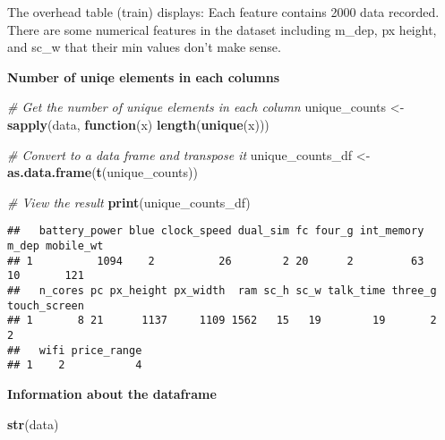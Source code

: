 \documentclass[
]{article}
\newenvironment{Shaded}{\begin{snugshade}}{\end{snugshade}}
\newcommand{\CommentTok}[1]{\textcolor[rgb]{0.56,0.35,0.01}{\textit{#1}}}
\newcommand{\ControlFlowTok}[1]{\textcolor[rgb]{0.13,0.29,0.53}{\textbf{#1}}}
\newcommand{\FunctionTok}[1]{\textcolor[rgb]{0.13,0.29,0.53}{\textbf{#1}}}
\newcommand{\NormalTok}[1]{#1}
\newcommand{\OtherTok}[1]{\textcolor[rgb]{0.56,0.35,0.01}{#1}}
\begin{document}
The overhead table (train) displays: Each feature contains 2000 data
recorded. There are some numerical features in the dataset including
m\_dep, px height, and sc\_w that their min values don't make sense.

\textbf{Number of uniqe elements in each columns}

\begin{Shaded}
\begin{Highlighting}[]
\CommentTok{\# Get the number of unique elements in each column}
\NormalTok{unique\_counts }\OtherTok{\textless{}{-}} \FunctionTok{sapply}\NormalTok{(data, }\ControlFlowTok{function}\NormalTok{(x) }\FunctionTok{length}\NormalTok{(}\FunctionTok{unique}\NormalTok{(x)))}

\CommentTok{\# Convert to a data frame and transpose it}
\NormalTok{unique\_counts\_df }\OtherTok{\textless{}{-}} \FunctionTok{as.data.frame}\NormalTok{(}\FunctionTok{t}\NormalTok{(unique\_counts))}

\CommentTok{\# View the result}
\FunctionTok{print}\NormalTok{(unique\_counts\_df)}
\end{Highlighting}
\end{Shaded}

\begin{verbatim}
##   battery_power blue clock_speed dual_sim fc four_g int_memory m_dep mobile_wt
## 1          1094    2          26        2 20      2         63    10       121
##   n_cores pc px_height px_width  ram sc_h sc_w talk_time three_g touch_screen
## 1       8 21      1137     1109 1562   15   19        19       2            2
##   wifi price_range
## 1    2           4
\end{verbatim}

\textbf{Information about the dataframe}

\begin{Shaded}
\begin{Highlighting}[]
\FunctionTok{str}\NormalTok{(data)}
\end{Highlighting}
\end{Shaded}
\end{document}
